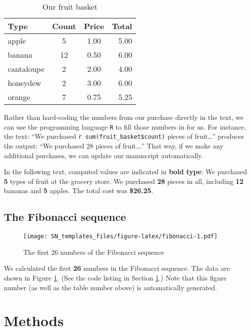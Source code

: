 \documentclass[smallextended]{svjour3}       %
\begin{document}
\begin{table}

\caption{\label{tab:fruit-basket}Our fruit basket}
\centering
\begin{tabular}[t]{lccr}
\toprule
Type & Count & Price & Total\\
\midrule
apple & 5 & 1.00 & 5.00\\
banana & 12 & 0.50 & 6.00\\
cantaloupe & 2 & 2.00 & 4.00\\
honeydew & 2 & 3.00 & 6.00\\
orange & 7 & 0.75 & 5.25\\
\bottomrule
\end{tabular}
\end{table}

Rather than hard-coding the numbers from our purchase directly in the text, we can use the programming language \texttt{R} to fill those numbers in for us. For instance, the text: ``We purchased \texttt{\textasciigrave{}r\ sum(fruit\_basket\$count)\textasciigrave{}} pieces of fruit\ldots{}'' produces the output: ``We purchased 28 pieces of fruit\ldots{}.'' That way, if we make any additional purchases, we can update our manuscript automatically.

In the following text, computed values are indicated in \textbf{bold type}: We purchased \textbf{5} types of fruit at the grocery store. We purchased \textbf{28} pieces in all, including \textbf{12} bananas and \textbf{5} apples. The total cost was \textbf{\$26.25}.

\hypertarget{sec:2}{%
\subsection{The Fibonacci sequence}\label{sec:2}}

\begin{figure}
\centering
\texttt{[image: SN\_templates\_files/figure-latex/fibonacci-1.pdf]}
\caption{\label{fig:fibonacci}The first 26 numbers of the Fibonacci sequence}
\end{figure}

We calculated the first \textbf{26} numbers in the Fibonacci sequence. The data are shown in Figure \ref{fig:fibonacci}. (See the code listing in Section \ref{methods}.) Note that this figure number (as well as the table number above) is automatically generated.

\hypertarget{methods}{%
\section{Methods}\label{methods}}
\end{document}
